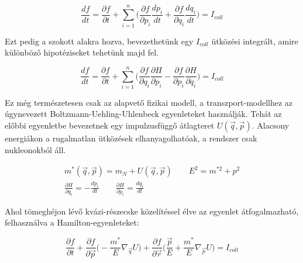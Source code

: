 \documentclass[a4paper,12pt]{article}
\begin{document}
\begin{equation}
	\frac{df}{dt} = \frac{\partial f}{\partial t} + \sum_{i = 1}^{n}\Big(\frac{\partial f}{\partial p_{i}}\frac{dp_{i}}{dt} + \frac{\partial f}{\partial q_{i}}\frac{dq_{i}}{dt}\Big) = I_{coll}
\end{equation}

\vspace{5mm}

\par Ezt pedig a szokott alakra hozva, bevezethetünk egy $I_{coll}$ \cite{wolfDSC} ütközési integrált, amire különböző hipotéziseket tehetünk majd fel.

\vspace{5mm}

\begin{equation}
	\frac{df}{dt} = \frac{\partial f}{\partial t} + \sum_{i = 1}^{n}\Big(\frac{\partial f}{\partial q_{i}}\frac{\partial H}{\partial p_{i}} - \frac{\partial f}{\partial p_{i}}\frac{\partial H}{\partial q_{i}}\Big) = I_{coll}
\end{equation}

\vspace{5mm}

\par Ez még természetesen csak az alapvető fizikai modell, a transzport-modellhez az úgynevezett Boltzmann-Uehling-Uhlenbeck \cite{buu} egyenleteket használják. Tehát az előbbi egyenletbe bevezetnek egy impulzusfüggő átlagteret $U(\vec{q}, \vec{p})$. Alacsony energiákon a rugalmatlan ütközések elhanyagolhatóak, a rendszer csak nukleonokból áll. 

\vspace{5mm}
	
\begin{gather}
	m^{*}(\vec{q}, \vec{p}) = m_{N} + U(\vec{q}, \vec{p}) \quad \quad E^{2} = m^{* 2} + p^{2} \\ 
	\frac{\partial H}{\partial q_{i}} = -\frac{dp_{i}}{dt} \quad \quad \frac{\partial H}{\partial p_{i}} =\frac{dq_{i}}{dt}
\end{gather}

\vspace{5mm}
	
\par Ahol tömeghéjon lévő kvázi-részecske közelítéssel élve az egyenlet átfogalmazható, felhasználva a Hamilton-egyenleteket:

\vspace{5mm}

\begin{equation} \label{BUU-eq:1}
	\frac{\partial f}{\partial t} + \frac{\partial f}{\partial \vec{p}}\Big(-\frac{m^{*}}{E}\nabla_{\vec{q}}U\Big) + \frac{\partial f}{\partial \vec{r}}\Big(\frac{\vec{p}}{E}+\frac{m^{*}}{E}\nabla_{\vec{p}}U\Big) = I_{coll}
\end{equation}
\end{document}

